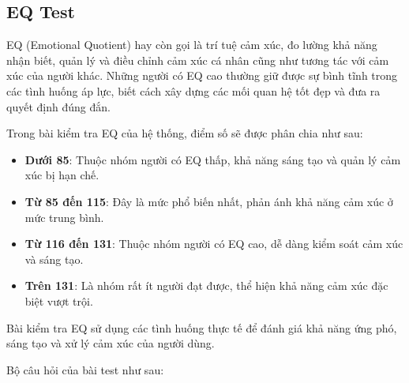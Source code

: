 \subsection{EQ Test}
EQ (Emotional Quotient) hay còn gọi là trí tuệ cảm xúc, đo lường khả năng nhận biết, quản lý và điều chỉnh cảm xúc cá nhân cũng như tương tác với cảm xúc của người khác. Những người có EQ cao thường giữ được sự bình tĩnh trong các tình huống áp lực, biết cách xây dựng các mối quan hệ tốt đẹp và đưa ra quyết định đúng đắn.

Trong bài kiểm tra EQ của hệ thống, điểm số sẽ được phân chia như sau:
\begin{itemize}
    \item \textbf{Dưới 85}: Thuộc nhóm người có EQ thấp, khả năng sáng tạo và quản lý cảm xúc bị hạn chế.
    \item \textbf{Từ 85 đến 115}: Đây là mức phổ biến nhất, phản ánh khả năng cảm xúc ở mức trung bình.
    \item \textbf{Từ 116 đến 131}: Thuộc nhóm người có EQ cao, dễ dàng kiểm soát cảm xúc và sáng tạo.
    \item \textbf{Trên 131}: Là nhóm rất ít người đạt được, thể hiện khả năng cảm xúc đặc biệt vượt trội.
\end{itemize}

Bài kiểm tra EQ sử dụng các tình huống thực tế để đánh giá khả năng ứng phó, sáng tạo và xử lý cảm xúc của người dùng.


Bộ câu hỏi của bài test như sau:

